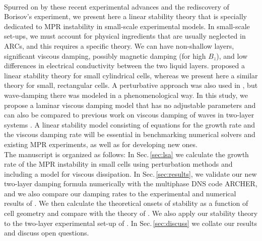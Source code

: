 \documentclass[aps,prfluids,reprint,superscriptaddress]{revtex4-2}
\begin{document}
\\
\indent Spurred on by these recent experimental advances and the rediscovery of Borisov's experiment, we present here a linear stability theory that is specially dedicated to MPR instability in small-scale experimental models. In small-scale set-ups, we must account for physical ingredients that are usually neglected in ARCs, and this requires a specific theory. We can have non-shallow layers, significant viscous damping, possibly magnetic damping (for high $B_z$), and low differences in electrical conductivity between the two liquid layers. \citet{Herreman2019} proposed a linear stability theory for small cylindrical cells, whereas we present here a similar theory for small, rectangular cells. A perturbative approach was also used in \citet{Politis2021}, but wave-damping there was modeled in a phenomenological way. In this study, we propose a laminar viscous damping model that has no adjustable parameters and can also be compared to previous work on viscous damping of waves in two-layer systems \cite{Keulegan1959,LaRocca2002}. A linear stability model consisting of equations for the growth rate and the viscous damping rate will be essential in benchmarking numerical solvers and existing MPR experiments, as well as for developing new ones. 
\\
\indent The manuscript is organized as follows: In Sec.\,\ref{sec:lsa} we calculate the growth rate of the MPR instability in small cells using  perturbation methods and including a model for viscous dissipation. In Sec.\,\ref{sec:results}, we  validate our new two-layer damping formula numerically with the multiphase DNS code ARCHER, and we also compare our damping rates to the experimental and numerical results of \citet{LaRocca2002}. We then calculate the theoretical onsets of stability as a function of cell geometry and compare with the theory of \citet{Politis2021}. We also apply our stability theory to the two-layer experimental set-up of \citet{Borisov2010}. In Sec.\,\ref{sec:discuss} we collate our results and discuss open questions.
\end{document}

